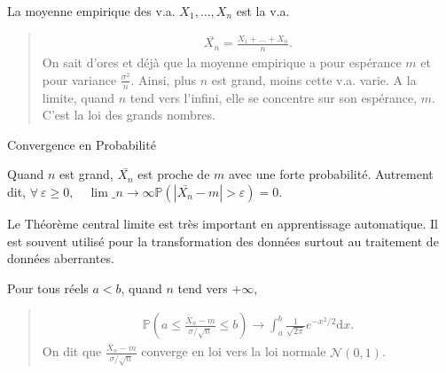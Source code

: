 \documentclass[letterpaper,11pt,english]{sphinxmanual}
\begin{document}
\begin{DUlineblock}{0em}
\item[] 
\item[] La moyenne empirique des v.a. \(X_1,\dots,X_n\) est la v.a.
\end{DUlineblock}
\begin{quote}
\begin{equation}\label{equation:chapter2:chapter2:53}
\begin{split}\bar{X_n} = \frac{X_1+\dots + X_n}{n}.\end{split}
\end{equation}
\sphinxAtStartPar
On sait d’ores et déjà que la moyenne empirique a pour espérance
\(m\) et pour variance \(\frac{\sigma^2}{n}\). Ainsi, plus
\(n\) est grand, moins cette v.a. varie. A la limite, quand
\(n\) tend vers l’infini, elle se concentre sur son espérance,
\(m\). C’est la loi des grands nombres.
\end{quote}

\begin{DUlineblock}{0em}
\item[]  Convergence en Probabilité
\item[] Quand \(n\) est grand, \(\bar{X_n}\) est proche de \(m\)
avec une forte probabilité. Autrement dit,
\(\forall\ \varepsilon \ge 0, \quad \lim\limits\_{n\to\infty} \mathbb{P}(|\bar{X_n}-m|> \varepsilon) = 0.\)
\end{DUlineblock}

\sphinxAtStartPar
{} Le Théorème central limite est très
important en apprentissage automatique. Il est souvent utilisé pour la
transformation des données surtout au traitement de données aberrantes.

\begin{DUlineblock}{0em}
\item[] 
\item[] Pour tous réels \(a<b\), quand \(n\) tend vers
\(+\infty\),
\end{DUlineblock}
\begin{quote}
\begin{equation}\label{equation:chapter2:chapter2:54}
\begin{split}\mathbb{P}\left(a \leq \frac{\bar{X}_{n}-m}{\sigma / \sqrt{n}} \leq b\right) \longrightarrow \int_{a}^{b} \frac{1}{\sqrt{2 \pi}} e^{-x^{2} / 2} \mathrm{d} x.\end{split}
\end{equation}
\sphinxAtStartPar
On dit que
\(\displaystyle \frac{\bar{X}_{n}-m}{\sigma / \sqrt{n}}\) converge
en loi vers la loi normale \(\mathcal{N}(0,1)\).
\end{quote}
\end{document}
